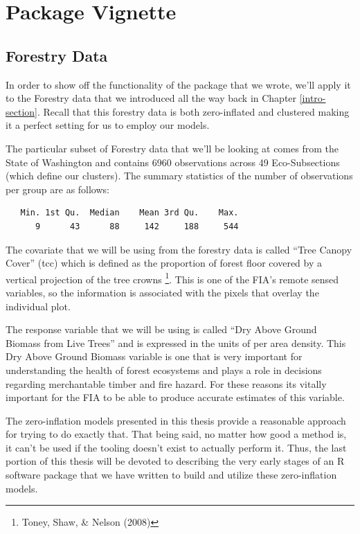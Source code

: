 \documentclass[12pt,twoside]{reedthesis}
\begin{document}
\hypertarget{vignette}{%
\chapter{Package Vignette}\label{vignette}}

\hypertarget{forestry-data}{%
\section{Forestry Data}\label{forestry-data}}

In order to show off the functionality of the package that we wrote, we'll apply it to the Forestry data that we introduced all the way back in Chapter \ref{intro-section}. Recall that this forestry data is both zero-inflated and clustered making it a perfect setting for us to employ our models.

The particular subset of Forestry data that we'll be looking at comes from the State of Washington and contains 6960 observations across 49 Eco-Subsections (which define our clusters). The summary statistics of the number of observations per group are as follows:
\begin{verbatim}
   Min. 1st Qu.  Median    Mean 3rd Qu.    Max. 
      9      43      88     142     188     544 
\end{verbatim}
The covariate that we will be using from the forestry data is called ``Tree Canopy Cover'' (tcc) which is defined as the proportion of forest floor covered by a vertical projection of the tree crowns \footnote{Toney, Shaw, \& Nelson (2008)}. This is one of the FIA's remote sensed variables, so the information is associated with the pixels that overlay the individual plot.

The response variable that we will be using is called ``Dry Above Ground Biomass from Live Trees'' and is expressed in the units of per area density. This Dry Above Ground Biomass variable is one that is very important for understanding the health of forest ecosystems and plays a role in decisions regarding merchantable timber and fire hazard. For these reasons its vitally important for the FIA to be able to produce accurate estimates of this variable.

The zero-inflation models presented in this thesis provide a reasonable approach for trying to do exactly that. That being said, no matter how good a method is, it can't be used if the tooling doesn't exist to actually perform it. Thus, the last portion of this thesis will be devoted to describing the very early stages of an R software package that we have written to build and utilize these zero-inflation models.
\end{document}
